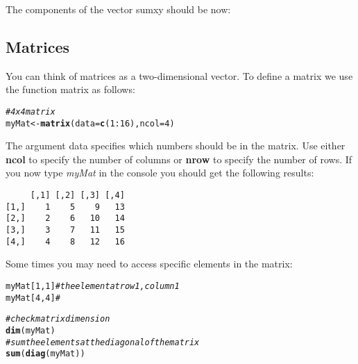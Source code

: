 \documentclass{article}\usepackage[]{graphicx}\usepackage[]{color}
\makeatletter
\newcommand{\hlnum}[1]{\textcolor[rgb]{0.686,0.059,0.569}{#1}}%
\newcommand{\hlcom}[1]{\textcolor[rgb]{0.678,0.584,0.686}{\textit{#1}}}%
\newcommand{\hlopt}[1]{\textcolor[rgb]{0,0,0}{#1}}%
\newcommand{\hlstd}[1]{\textcolor[rgb]{0.345,0.345,0.345}{#1}}%
\newcommand{\hlkwb}[1]{\textcolor[rgb]{0.69,0.353,0.396}{#1}}%
\newcommand{\hlkwc}[1]{\textcolor[rgb]{0.333,0.667,0.333}{#1}}%
\newcommand{\hlkwd}[1]{\textcolor[rgb]{0.737,0.353,0.396}{\textbf{#1}}}%
\newenvironment{kframe}{%
 \def\at@end@of@kframe{}%
 \ifinner\ifhmode%
  \def\at@end@of@kframe{\end{minipage}}%
  \begin{minipage}{\columnwidth}%
 \fi\fi%
 \def\FrameCommand##1{\hskip\@totalleftmargin \hskip-\fboxsep
 \colorbox{shadecolor}{##1}\hskip-\fboxsep
     \hskip-\linewidth \hskip-\@totalleftmargin \hskip\columnwidth}%
 \MakeFramed {\advance\hsize-\width
   \@totalleftmargin\z@ \linewidth\hsize
   \@setminipage}}%
 {\par\unskip\endMakeFramed%
 \at@end@of@kframe}
\newenvironment{knitrout}{}{} %
\makeatother
\begin{document}
The components of the vector sumxy should be now:
\begin{knitrout}
\color{fgcolor}\begin{kframe}


{\ttfamily\noindent\bfseries\color{errorcolor}{\#\# Error in eval(expr, envir, enclos): object 'x' not found}}

{\ttfamily\noindent\bfseries\color{errorcolor}{\#\# Error in eval(expr, envir, enclos): object 'sumxy' not found}}\end{kframe}
\end{knitrout}

\subsection{Matrices}

You can think of matrices as a two-dimensional vector. To define a matrix we use the function matrix as follows: 
\begin{knitrout}
\color{fgcolor}\begin{kframe}
\begin{alltt}
\hlcom{# 4 x 4 matrix }
\hlstd{myMat} \hlkwb{<-} \hlkwd{matrix} \hlstd{(}\hlkwc{data}\hlstd{=}\hlkwd{c}\hlstd{(}\hlnum{1}\hlopt{:}\hlnum{16}\hlstd{),}\hlkwc{ncol} \hlstd{=} \hlnum{4}\hlstd{)}
\end{alltt}
\end{kframe}
\end{knitrout}

The argument data specifies which numbers should be in the matrix. Use either \textbf{ncol} to specify the number of columns or \textbf{nrow} to specify the number of rows. If you now type \textit{myMat} in the console you should get the following results:
\begin{knitrout}
\color{fgcolor}\begin{kframe}
\begin{verbatim}
     [,1] [,2] [,3] [,4]
[1,]    1    5    9   13
[2,]    2    6   10   14
[3,]    3    7   11   15
[4,]    4    8   12   16
\end{verbatim}
\end{kframe}
\end{knitrout}

Some times you may need to access specific elements in the matrix:

\begin{knitrout}
\color{fgcolor}\begin{kframe}
\begin{alltt}
\hlstd{myMat[}\hlnum{1}\hlstd{,}\hlnum{1}\hlstd{]}\hlcom{# the element at row 1, column 1}
\hlstd{myMat[}\hlnum{4}\hlstd{,}\hlnum{4}\hlstd{]}\hlcom{# }

\hlcom{# check matrix dimension}
\hlkwd{dim}\hlstd{(myMat)}
\hlcom{# sum the elements at the diagonal of the matrix }
\hlkwd{sum}\hlstd{(}\hlkwd{diag}\hlstd{(myMat))}
\end{alltt}
\end{kframe}
\end{knitrout}
\end{document}
